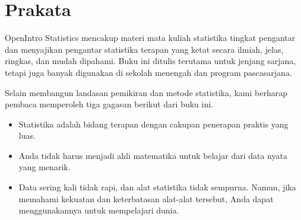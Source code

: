 \chapter*{{\color{oiB}Prakata}}

\noindent%
OpenIntro Statistics mencakup materi mata kuliah statistika tingkat pengantar
dan menyajikan pengantar statistika terapan yang ketat secara ilmiah,
jelas, ringkas, dan mudah dipahami.
Buku ini ditulis terutama untuk jenjang sarjana,
tetapi juga banyak digunakan di sekolah menengah dan program pascasarjana.
\vspace{3mm}

Selain membangun landasan pemikiran dan metode statistika,
kami berharap pembaca memperoleh tiga gagasan berikut
dari buku ini.\vspace{-1mm}
\begin{itemize}
\setlength{\itemsep}{0mm}
\item
    Statistika adalah bidang terapan dengan cakupan
    penerapan praktis yang luas.
\item
    Anda tidak harus menjadi ahli matematika untuk belajar
    dari data nyata yang menarik.
\item
    Data sering kali tidak rapi, dan alat statistika tidak sempurna.
    Namun, jika memahami kekuatan dan keterbatasan alat-alat tersebut,
    Anda dapat menggunakannya untuk mempelajari dunia.
\end{itemize}


%
%
%


